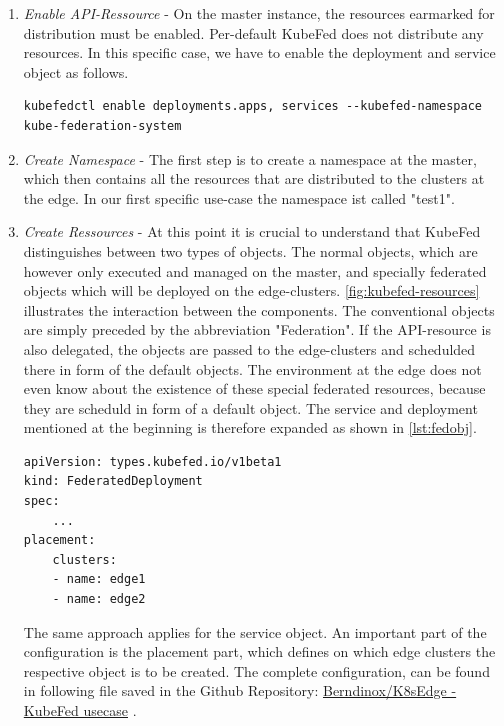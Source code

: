 \documentclass[MIC,Master,english]{twbook}%
\begin{document}
\begin{enumerate}
    \item \textit{Enable API-Ressource} - On the master instance, the resources earmarked for distribution must be enabled. Per-default KubeFed does not distribute any resources. In this specific case, we have to enable the deployment and service object as follows.
    \begin{lstlisting}[caption={Enable federation},captionpos=b]
kubefedctl enable deployments.apps, services --kubefed-namespace kube-federation-system
    \end{lstlisting}
    \item \textit{Create Namespace} - The first step is to create a namespace at the master, which then contains all the resources that are distributed to the clusters at the edge. In our first specific use-case the namespace ist called "test1".
    \item \textit{Create Ressources} - At this point it is crucial to understand that KubeFed distinguishes between two types of objects. The normal objects, which are however only executed and managed on the master, and specially federated objects which will be deployed on the edge-clusters. \autoref{fig:kubefed-resources} illustrates the interaction between the components. The conventional objects are simply preceded by the abbreviation "Federation". If the API-resource is also delegated, the objects are passed to the edge-clusters and schedulded there in form of the default objects. The environment at the edge does not even know about the existence of these special federated resources, because they are scheduld in form of a default object. The service and deployment mentioned at the beginning is therefore expanded as shown in \autoref{lst:fedobj}.

    \begin{lstlisting}[caption={Federated Object},captionpos=b,label=lst:fedobj]
apiVersion: types.kubefed.io/v1beta1
kind: FederatedDeployment
spec:
    ...
placement:
    clusters:
    - name: edge1
    - name: edge2
    \end{lstlisting}
    The same approach applies for the service object. An important part of the configuration is the placement part, which defines on which edge clusters the respective object is to be created. The complete configuration, can be found in following file saved in the Github Repository: \hyperref{https://github.com/Berndinox/K8sEdge/blob/main/DOCs/kubefed-usecase1.md}{}{}{Berndinox/K8sEdge - KubeFed usecase} \cite{bk-gh-usecase}.
\end{enumerate}
\end{document}
